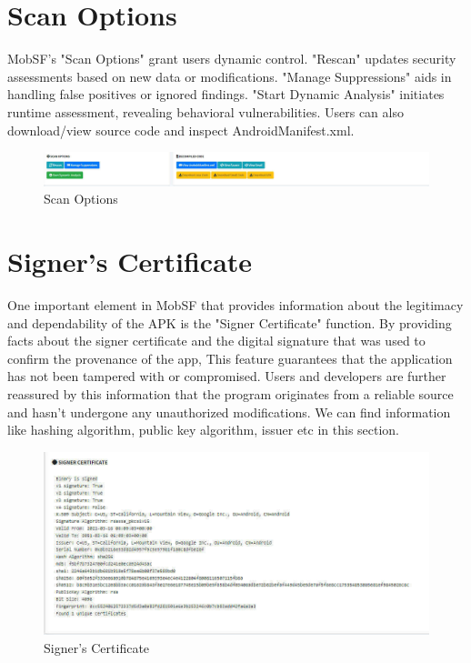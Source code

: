 \documentclass{report}
\begin{document}
\section{Scan Options} 
MobSF's "Scan Options" grant users dynamic control. "Rescan" updates security assessments based on new data or modifications. "Manage Suppressions" aids in handling false positives or ignored findings. "Start Dynamic Analysis" initiates runtime assessment, revealing behavioral vulnerabilities.  Users can also download/view source code and inspect AndroidManifest.xml. 
\begin{figure}[hbt!]
        \centering
        \includegraphics[width=1\textwidth]{images/scan.jpg}
        \caption{Scan Options}
        \label{fig:example}
\end{figure}

\section{Signer's Certificate}
One important element in MobSF that provides information about the legitimacy and dependability of the APK is the "Signer Certificate" function. By providing facts about the signer certificate and the digital signature that was used to confirm the provenance of the app, \newline 
This feature guarantees that the application has not been tampered with or compromised. Users and developers are further reassured by this information that the program originates from a reliable source and hasn't undergone any unauthorized modifications. We can find information like hashing algorithm, public key algorithm, issuer etc in this section. 

\begin{figure}[hbt!]
        \centering
        \includegraphics[width=1\textwidth]{images/signer's certificate.jpg}
        \caption{Signer's Certificate}
        \label{fig:example}
\end{figure}
\end{document}
